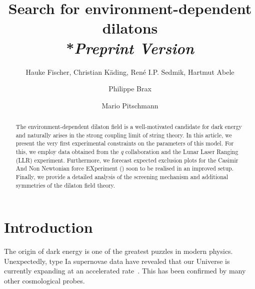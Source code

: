 \documentclass[aps,pra,twocolumn,floatfix,superscriptaddress,nofootinbib,showpacs,a4paper,balancelastpage,twoside]{revtex4-2}
\newcommand{\qbounce}{{\it{q}}{\sc{Bounce}}}				%
\newcommand{\cannex}{{\sc{Cannex}}}				%
\begin{document}
\title{Search for environment-dependent dilatons\\*\emph{Preprint Version}} 
%
\author{Hauke Fischer, Christian Käding, René I.P. Sedmik, Hartmut Abele}
\author{Philippe Brax}
\author{Mario Pitschmann}
%
\begin{abstract}
The environment-dependent dilaton field is a well-motivated candidate for dark energy and naturally arises in the strong coupling limit of string theory. In this article, we present the very first experimental constraints on the parameters of this model. For this, we employ data obtained from the \qbounce{} collaboration and the Lunar Laser Ranging  (LLR) experiment. Furthermore, we forecast expected exclusion plots for the Casimir And Non Newtonian force EXperiment (\cannex) soon to be realised in an improved setup. Finally, we provide a detailed analysis of the screening mechanism and additional symmetries of the dilaton field theory.\nopagebreak
\end{abstract}
%
%
\maketitle
%
\section{Introduction}

The origin of dark energy is one of the greatest puzzles in modern physics. Unexpectedly, type Ia supernovae data have revealed that our Universe is currently expanding at an accelerated rate~\cite{SupernovaCosmologyProject:1997zqe, SupernovaSearchTeam:1998fmf, SupernovaSearchTeam:1998bnz}. This has been confirmed by many other cosmological probes. 
\end{document}
